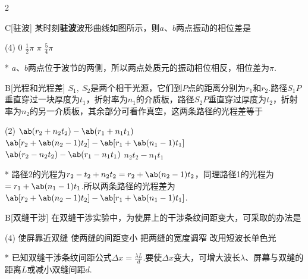\begin{paracol}{2}
    \begin{choice}{C}[驻波]
        某时刻\textbf{驻波}波形曲线如图所示，则$a$、$b$两点振动的相位差是
        \begin{tasks}(4)
            \task $0$
            \task $\frac{1}{2}\pi$
            \task $\pi$
            \task $\frac{5}{4}\pi$
        \end{tasks}
    \end{choice}
\begin{solution}*
    $a$、$b$两点位于波节的两侧，所以两点处质元的振动相位相反，相位差为$\pi$.
\end{solution}
\switchcolumn\centering
\vfill
{}
\vfill
\end{paracol}

\begin{choice}{B}[光程和光程差]
    $S_1,\ S_2$是两个相干光源，它们到$P$点的距离分别为$r_1$和$r_2$.路径$S_1P$垂直穿过一块厚度为$t_1$，折射率为$n_1$的介质板，路径$S_2P$垂直穿过厚度为$t_2$，折射率为$n_2$的另一介质板，其余部分可看作真空，这两条路径的光程差等于
    \begin{tasks}(2)
        \task $\ab(r_2+n_2t_2)-\ab(r_1+n_1t_1)$
        \task $\ab[r_2+\ab(n_2-1)t_2]-\ab[r_1+\ab(n_1-1)t_1]$
        \task $\ab(r_2-n_2t_2)-\ab(r_1-n_1t_1)$
        \task $n_2t_2-n_1t_1$
    \end{tasks}
\end{choice}
\begin{solution}*
    路径2的光程为$r_2-t_2+n_2t_2=r_2+\ab(n_2-1)t_2$，同理路径1的光程为$=r_1+\ab(n_1-1)t_1$.所以两条路径的光程差为$\ab[r_2+\ab(n_2-1)t_2]-\ab[r_1+\ab(n_1-1)t_1]$.
\end{solution}

\begin{choice}{B}[双缝干涉]
    在双缝干涉实验中，为使屏上的干涉条纹间距变大，可采取的办法是
    \begin{tasks}(4)
        \task 使屏靠近双缝
        \task 使两缝的间距变小
        \task 把两缝的宽度调窄
        \task 改用短波长单色光
    \end{tasks}
\end{choice}
\begin{solution}*
    已知双缝干涉条纹间距公式$\Delta x=\frac{\lambda L}{d}$.要使$\Delta x$变大，可增大波长$\lambda$、屏幕与双缝的距离$L$或减小双缝间距$d$.
\end{solution}

